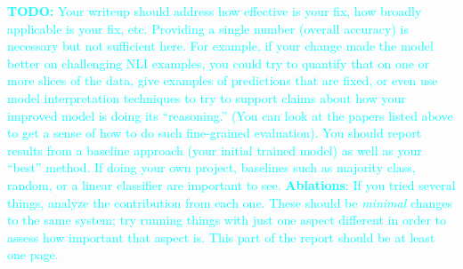 \documentclass[twocolumn]{article}
\newcommand{\todo}[1]{\textcolor{cyan}{\textbf{TODO:} #1}}
\begin{document}
\todo{
Your writeup should address how effective is your fix, how broadly applicable
is your fix, etc. Providing a single number (overall accuracy) is necessary but
not sufficient here. For example, if your change made the model better on
challenging NLI examples, you could try to quantify that on one or more slices
of the data, give examples of predictions that are fixed, or even use model
interpretation techniques to try to support claims about how your improved
model is doing its ``reasoning.'' (You can look at the papers listed above to
get a sense of how to do such fine-grained evaluation).  You should report
results from a baseline approach (your initial trained model) as well as your
``best'' method. If doing your own project, baselines such as majority class,
random, or a linear classifier are important to see. \textbf{Ablations}: If you
tried several things, analyze the contribution from each one. These should be
\emph{minimal} changes to the same system; try running things with just one
aspect different in order to assess how important that aspect is. This part of
the report should be at least one page.}





\end{document}
